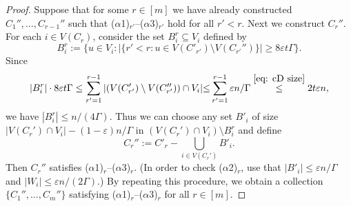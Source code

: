 \documentclass[a4paper, 11pt, reqno]{amsart}
\numberwithin{equation}{section}
\newcommand{\1}{{\rm 1\hspace*{-0.4ex}%
\rule{0.1ex}{1.52ex}\hspace*{0.2ex}}}
\renewcommand{\epsilon}{\varepsilon}
\newcommand{\sm}{\setminus}
\begin{document}
\begin{proof}
Suppose that for some $r\in [m]$ we have already constructed $C_1'',\dots, C_{r-1}''$ such that
($\alpha$1)$_{r'}$--($\alpha$3)$_{r'}$ hold for all $r'<r$.
Next we construct $C_{r}''$. 
For each $i\in V(C_{r})$, consider the set $B^r_{i}\subseteq V_{i}$ defined by 
$$B^{r}_{i}:=\{u \in V_{i}: |\{ r'< r :u\in V(C'_{r'})\sm V(C_{r'}'') \}|\geq 8\epsilon t\Gamma\}.$$
Since 
$$
|B_{i}^{r}|\cdot 8 \epsilon t \Gamma \leq 
\sum_{r'=1}^{r-1} |(V(C'_{r'})\setminus V(C''_{r'})) \cap V_{i}| 
{\leq} 
\sum_{r'=1}^{r-1} \epsilon n/\Gamma 
\stackrel{\eqref{eq: cD size}}{\leq} 2t\epsilon n,$$
we have $|B^{r}_{i}|\leq n/(4\Gamma)$.
Thus we can choose any set $B'_{i}$ of size $|V(C_r')\cap V_i| - (1-\epsilon)n/\Gamma$ in $(V(C_r')\cap V_i) \sm  B^r_{i}$ and 
define 
$$C_r'':= C'_r - \bigcup_{i \in V(C_r') } B'_{i}.$$
Then $C_r''$ satisfies ($\alpha$1)$_r$--($\alpha$3)$_r$. 
(In order to check ($\alpha$2)$_r$, use that $|B'_i|\leq \epsilon n/\Gamma$ and $|W_i|\leq \epsilon n/ (2\Gamma)$.)
By repeating this procedure, we obtain a collection $\{C_1'',\dots, C_m''\}$ satisfying ($\alpha$1)$_{r}$--($\alpha$3)$_{r}$ for all $r\in [m]$.



\end{proof}
\end{document}
